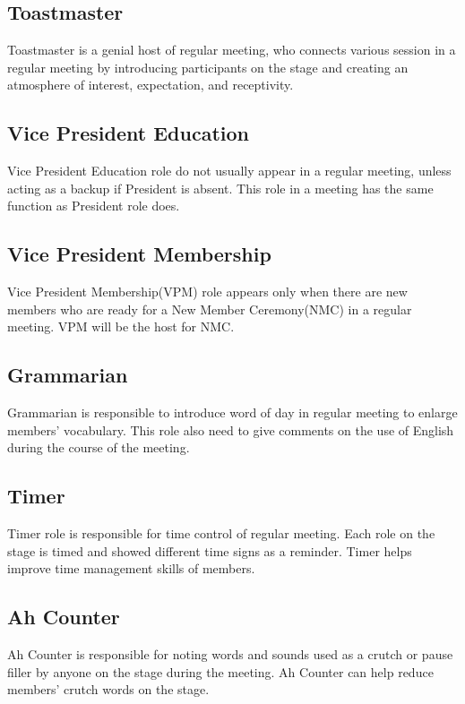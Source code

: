 \subsection{Toastmaster}

Toastmaster is a genial host of regular meeting, who connects various 
session in a regular meeting by introducing participants on the stage 
and creating an atmosphere of interest, expectation, and receptivity.

\subsection{Vice President Education}

Vice President Education role do not usually appear in a regular meeting,
unless acting as a backup if President is absent. This role in a meeting
has the same function as President role does.

\subsection{Vice President Membership}

Vice President Membership(VPM) role appears only when there are new members 
who are ready for a New Member Ceremony(NMC) in a regular meeting. VPM will 
be the host for NMC.

\subsection{Grammarian}

Grammarian is responsible to introduce word of day in regular meeting to enlarge
members' vocabulary. This role also need to give comments on the use of English
during the course of the meeting.

\subsection{Timer}

Timer role is responsible for time control of regular meeting. Each role on
the stage is timed and showed different time signs as a reminder. Timer helps 
improve time management skills of members. 

\subsection{Ah Counter}

Ah Counter is responsible for noting words and sounds used as a crutch or 
pause filler by anyone on the stage during the meeting. Ah Counter can help 
reduce members' crutch words on the stage.

